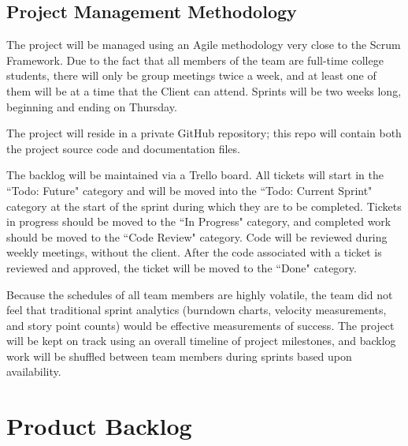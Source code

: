 {\subsection{Project  Management Methodology}
The project will be managed using an Agile methodology very close to the Scrum Framework. Due to the fact that all members of the team are full-time college students, there will only be group meetings twice a week, and at least one of them will be at a time that the Client can attend. Sprints will be two weeks long, beginning and ending on Thursday.

The project will reside in a private GitHub repository; this repo will contain both the project source code and documentation files.

The backlog will be maintained via a Trello board. All tickets will start in the ``Todo: Future" category and will be moved into the ``Todo: Current Sprint" category at the start of the sprint during which they are to be completed. Tickets in progress should be moved to the ``In Progress" category, and completed work should be moved to the ``Code Review" category. Code will be reviewed during weekly meetings, without the client. After the code associated with a ticket is reviewed and approved, the ticket will be moved to the ``Done" category.

Because the schedules of all team members are highly volatile, the team did not feel that traditional sprint analytics (burndown charts, velocity measurements, and story point counts) would be effective measurements of success. The project will be kept on track using an overall timeline of project milestones, and backlog work will be shuffled between team members during sprints based upon availability.

\section{Product Backlog}
 
}

